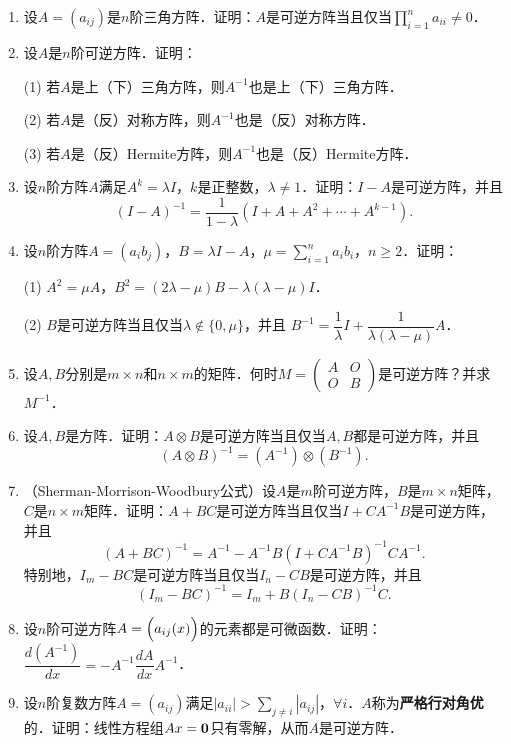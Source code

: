\documentclass[a4paper,fontset=windows]{ctexbook}
\theoremstyle{definition}
\renewcommand{\ge}{\geqslant}
\begin{document}
\begin{enumerate}
\item 设$A=(a_{ij})$是$n$阶三角方阵．证明：$A$是可逆方阵当且仅当$\prod\limits_{i=1}^na_{ii}\ne 0$．

\item 设$A$是$n$阶可逆方阵．证明：

(1) 若$A$是上（下）三角方阵，则$A^{-1}$也是上（下）三角方阵．

(2) 若$A$是（反）对称方阵，则$A^{-1}$也是（反）对称方阵．

(3) 若$A$是（反）Hermite方阵，则$A^{-1}$也是（反）Hermite方阵．

\item 设$n$阶方阵$A$满足$A^k=\lambda I$，$k$是正整数，$\lambda\ne 1$．证明：$I-A$是可逆方阵，并且
$$(I-A)^{-1}=\frac{1}{1-\lambda}(I+A+A^2+\cdots+A^{k-1}).$$

\item 设$n$阶方阵$A=(a_ib_j)$，$B=\lambda I-A$，$\mu=\sum\limits_{i=1}^na_ib_i$，$n\ge 2$．证明：

(1) $A^2=\mu A$，$B^2=(2\lambda-\mu)B-\lambda(\lambda-\mu)I$．

(2) $B$是可逆方阵当且仅当$\lambda\notin\{0,\mu\}$，并且
$B^{-1}=\dfrac{1}{\lambda}I+\dfrac{1}{\lambda(\lambda-\mu)}A$．

\item 设$A,B$分别是$m\times n$和$n\times m$的矩阵．何时$M=\begin{pmatrix}A&O \\ O&B\end{pmatrix}$是可逆方阵？并求$M^{-1}$．

\item 设$A,B$是方阵．证明：$A\otimes B$是可逆方阵当且仅当$A,B$都是可逆方阵，并且
$$(A\otimes B)^{-1}=(A^{-1})\otimes(B^{-1}).$$

\item（Sherman-Morrison-Woodbury公式）设$A$是$m$阶可逆方阵，$B$是$m\times n$矩阵，$C$是$n\times m$矩阵．证明：$A+BC$是可逆方阵当且仅当$I+CA^{-1}B$是可逆方阵，并且
$$(A+BC)^{-1}=A^{-1}-A^{-1}B(I+CA^{-1}B)^{-1}CA^{-1}.$$
特别地，$I_m-BC$是可逆方阵当且仅当$I_n-CB$是可逆方阵，并且
$$(I_m-BC)^{-1}=I_m+B(I_n-CB)^{-1}C.$$

\item 设$n$阶可逆方阵$A=\Bigl(a_{ij}(x)\Bigr)$的元素都是可微函数．证明：$\dfrac{d(A^{-1})}{dx}=-A^{-1}\dfrac{dA}{dx}A^{-1}$．

\item 设$n$阶复数方阵$A=(a_{ij})$满足$|a_{ii}|>\sum\limits_{j\ne i}|a_{ij}|$，$\forall i$．$A$称为{\bf 严格行对角优}的．证明：线性方程组$Ax={\bf 0}$只有零解，从而$A$是可逆方阵．


\end{enumerate}
\end{document}

